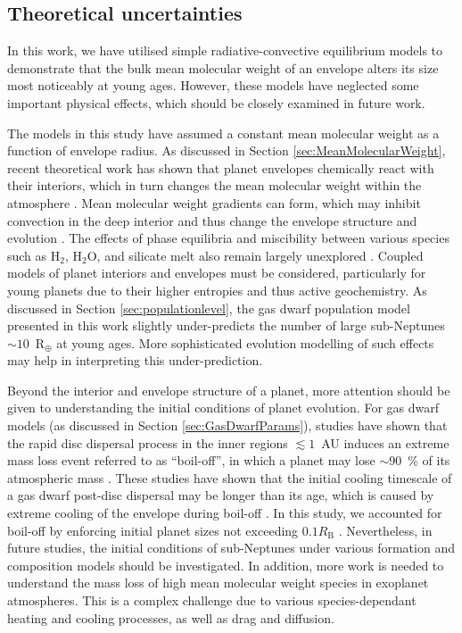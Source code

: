 \documentclass[fleqn,usenatbib]{mnras}
\begin{document}
\subsection{Theoretical uncertainties} \label{sec:theory_uncertainties}
In this work, we have utilised simple radiative-convective equilibrium models to demonstrate that the bulk mean molecular weight of an envelope alters its size most noticeably at young ages. However, these models have neglected some important physical effects, which should be closely examined in future work. 

The models in this study have assumed a constant mean molecular weight as a function of envelope radius. As discussed in Section \ref{sec:MeanMolecularWeight}, recent theoretical work has shown that planet envelopes chemically react with their interiors, which in turn changes the mean molecular weight within the atmosphere \citep[e.g.][]{Kite2021,Schlichting2022}. Mean molecular weight gradients can form, which may inhibit convection in the deep interior and thus change the envelope structure and evolution \citep[e.g.][]{Leconte2017,Misener2022}. The effects of phase equilibria and miscibility between various species such as H$_2$, H$_2$O, and silicate melt also remain largely unexplored \citep[e.g.][]{Mousis2020,Vazan2022,Pierrehumbert2023,Gupta2024,Young2024}. Coupled models of planet interiors and envelopes must be considered, particularly for young planets due to their higher entropies and thus active geochemistry. As discussed in Section \ref{sec:populationlevel}, the gas dwarf population model presented in this work slightly under-predicts the number of large sub-Neptunes $\sim 10$~R$_\oplus$ at young ages. More sophisticated evolution modelling of such effects may help in interpreting this under-prediction.   

Beyond the interior and envelope structure of a planet, more attention should be given to understanding the initial conditions of planet evolution. For gas dwarf models (as discussed in Section \ref{sec:GasDwarfParams}), studies have shown that the rapid disc dispersal process in the inner regions $\lesssim 1$~AU induces an extreme mass loss event referred to as ``boil-off'', in which a planet may lose $\sim 90$~\% of its atmospheric mass \citep[e.g.][]{Owen2016,Ginzburg2016,Rogers2024a,Tang2024}. These studies have shown that the initial cooling timescale of a gas dwarf post-disc dispersal may be longer than its age, which is caused by extreme cooling of the envelope during boil-off \citep{Owen2020}. In this study, we accounted for boil-off by enforcing initial planet sizes not exceeding $0.1 R_\text{B}$ \citep[see][]{Owen2016}. Nevertheless, in future studies, the initial conditions of sub-Neptunes under various formation and composition models should be investigated. In addition, more work is needed to understand the mass loss of high mean molecular weight species in exoplanet atmospheres. This is a complex challenge due to various species-dependant heating and cooling processes, as well as drag and diffusion.
\end{document}
